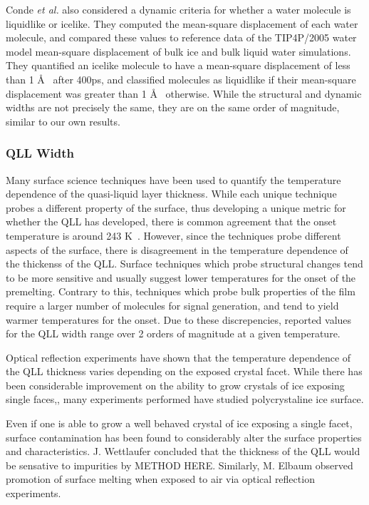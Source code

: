 Conde \textit{et al.} also considered a dynamic criteria for whether a
water molecule is liquidlike or icelike. They computed the mean-square
displacement of each water molecule, and compared these values to
reference data of the TIP4P/2005 water model mean-square displacement
of bulk ice and bulk liquid water simulations. They quantified an
icelike molecule to have a mean-square displacement of less than 1
\AA~ after 400ps, and classified molecules as liquidlike if their
mean-square displacement was greater than 1 \AA~ otherwise. While the
structural and dynamic widths are not precisely the same, they are on
the same order of magnitude, similar to our own results. 


\subsubsection{QLL Width}
Many surface science techniques have been used to quantify the
temperature dependence of the quasi-liquid layer
thickness.\cite{Kouchi1987,Golecki1978,Dosch1995,Beaglehole1980, Bluhm1999,
  Bluhm2002, Furukawa1987, Elbaum1993, Dosch1996, Doppenschmidt2000,
  Kaverin2004, Lied1994} While each unique technique probes a different property of
the surface, thus developing a unique metric for whether the QLL has
developed, there is common agreement that the onset temperature is
around 243 K~. However, since the techniques probe different aspects
of the surface, there is disagreement in the temperature dependence of
the thickenss of the QLL. Surface techniques which probe structural
changes tend to be more sensitive and usually suggest lower
temperatures for the onset of the premelting. Contrary to this,
techniques which probe bulk properties of the film require a larger
number of molecules for signal generation, and tend to yield warmer
temperatures for the onset. Due to these discrepencies, reported
values for the QLL width range over 2 orders of magnitude at a given
temperature.\cite{Rosenberg2005,Dosch1996}

Optical reflection experiments have shown that the temperature
dependence of the QLL thickness varies depending on the exposed
crystal facet.\cite{Elbaum1993} While there has been considerable improvement
on the ability to grow crystals of ice exposing single
faces,\cite{Shultz2014, Shultz2017}, many experiments performed have studied
polycrystaline ice surface.

Even if one is able to grow a well behaved crystal of ice exposing a
single facet, surface contamination has been found to considerably
alter the surface properties and characteristics. J. Wettlaufer
concluded that the thickness of the QLL would be sensative to
impurities by METHOD HERE.\cite{Wettlaufer1999} Similarly, M. Elbaum observed
promotion of surface melting when exposed to air via optical
reflection experiments.\cite{Elbaum1993} 



